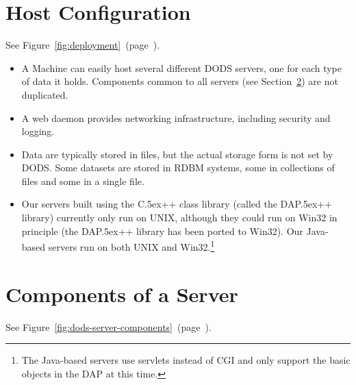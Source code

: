 \documentclass{article}
\newcommand{\Cpp}{\rm {\small C}\raise.5ex\hbox{\footnotesize ++}\xspace}
\newcommand{\dap}{\rm {\small DAP}\raise.5ex\hbox{\footnotesize ++}\xspace}
\begin{document}
\section{Host Configuration}
\label{sec:configuration}

See Figure~\ref{fig:deployment}~(page~\pageref{fig:deployment}).

\begin{itemize}
\item A Machine can easily host several different DODS servers, one for each
  type of data it holds. Components common to all servers (see
  Section~\ref{sec:components}) are not duplicated.
  
\item A web daemon provides networking infrastructure, including security and
  logging.
  
\item Data are typically stored in files, but the actual storage form is not
  set by DODS. Some datasets are stored in RDBM systems, some in collections
  of files and some in a single file.
  
\item Our servers built using the \Cpp class library (called the \dap
  library) currently only run on UNIX, although they could run on Win32 in
  principle (the \dap library has been ported to Win32). Our Java-based
  servers run on both UNIX and Win32.\footnote{The Java-based servers use
    servlets instead of CGI and only support the basic objects in the DAP at
    this time.}
\end{itemize}

\begin{sidewaysfigure}[h]
\begin{center}
\caption{A machine which hosts a DODS server must also have a web daemon
  running and provide access to the data served.}
\label{fig:deployment}
\end{center}
\end{sidewaysfigure}

\section{Components of a Server}
\label{sec:components}

See Figure~\ref{fig:dods-server-components}~(page~\pageref{fig:dods-server-components}).
\end{document}
